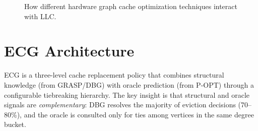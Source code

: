 \documentclass[conference]{IEEEtran}
\begin{document}
\begin{figure}[t]
  \centering
  
  \caption{How different hardware graph cache optimization techniques interact with LLC.}
  \label{fig:fig3}
\end{figure}





\section{ECG Architecture}
\label{ECG:Architecture}

ECG is a three-level cache replacement policy that combines structural knowledge (from GRASP/DBG) with oracle prediction (from P-OPT) through a configurable tiebreaking hierarchy. The key insight is that structural and oracle signals are \emph{complementary}: DBG resolves the majority of eviction decisions (70--80\%), and the oracle is consulted only for ties among vertices in the same degree bucket.
\end{document}
